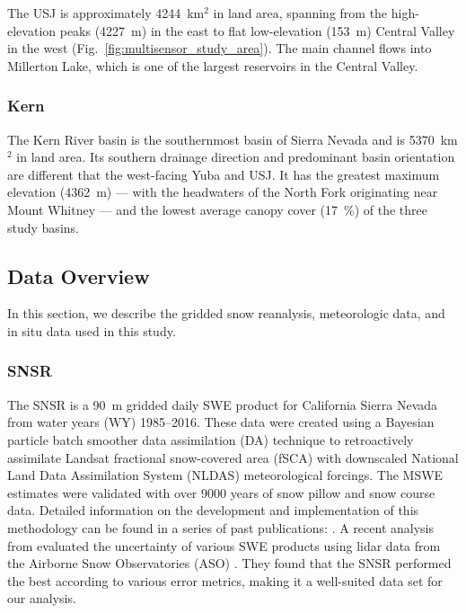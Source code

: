 The USJ is approximately 4244~km$^{2}$ in land area, spanning from the high-elevation peaks (4227~m) in the east to flat low-elevation (153~m) Central Valley in the west (Fig.~\ref{fig:multisensor_study_area}). The main channel flows into Millerton Lake, which is one of the largest reservoirs in the Central Valley. 

\hypertarget{ch2-sa-3}{\subsubsection{Kern}\label{ch2-sa-3}}

The Kern River basin is the southernmost basin of Sierra Nevada and is 5370~km$^{2}$ in land area. Its southern drainage direction and predominant basin orientation are different that the west-facing Yuba and USJ. It has the greatest maximum elevation (4362~m) --- with the headwaters of the North Fork originating near Mount Whitney --- and the lowest average canopy cover (17~\%) of the three study basins. 

\hypertarget{ch2-do-1}{\subsection{Data Overview}\label{ch2-do-1}}

In this section, we describe the gridded snow reanalysis, meteorologic data, and in situ data used in this study.

\hypertarget{ch2-do-2}{\subsubsection{SNSR}\label{ch2-do-2}}

The SNSR \citep{margulisLandsatEraSierraNevada2016} is a 90~m gridded daily SWE product for California Sierra Nevada from water years (WY) 1985--2016. These data were created using a Bayesian particle batch smoother data assimilation (DA) technique to retroactively assimilate Landsat fractional snow-covered area (fSCA) with downscaled National Land Data Assimilation System (NLDAS) meteorological forcings. The MSWE estimates were validated with over 9000 years of snow pillow and snow course data. Detailed information on the development and implementation of this methodology can be found in a series of past publications: \cite{durandBayesianApproachSnow2008, girottoExaminingSpatialTemporal2014, girottoProbabilisticSWEReanalysis2014, margulisParticleBatchSmoother2015}. A recent analysis from \cite{yangIntercomparisonSnowWater2023} evaluated the uncertainty of various SWE products using lidar data from the Airborne Snow Observatories (ASO) \citep{painterAirborneSnowObservatory2016}. They found that the SNSR performed the best according to various error metrics, making it a well-suited data set for our analysis.

